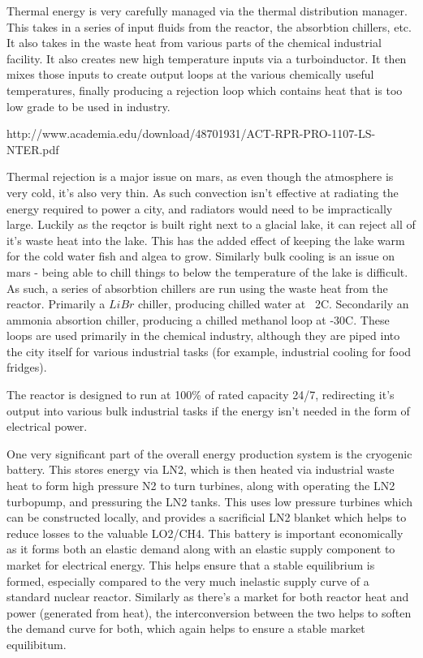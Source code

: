 \documentclass[10pt]{article}
\begin{document}
Thermal energy is very carefully managed via the thermal distribution manager. This takes in a series of input fluids from the reactor, the absorbtion chillers, etc. It also takes in the waste heat from various parts of the chemical industrial facility. It also creates new high temperature inputs via a turboinductor. It then mixes those inputs to create output loops at the various chemically useful temperatures, finally producing a rejection loop which contains heat that is too low grade to be used in industry.

http://www.academia.edu/download/48701931/ACT-RPR-PRO-1107-LS-NTER.pdf

Thermal rejection is a major issue on mars, as even though the atmosphere is very cold, it's also very thin. As such convection isn't effective at radiating the energy required to power a city, and radiators would need to be impractically large. Luckily as the reqctor is built right next to a glacial lake, it can reject all of it's waste heat into the lake. This has the added effect of keeping the lake warm for the cold water fish and algea to grow. Similarly bulk cooling is an issue on mars - being able to chill things to below the temperature of the lake is difficult. As such, a series of absorbtion chillers are run using the waste heat from the reactor. Primarily a $LiBr$ chiller, producing chilled water at ~2C. Secondarily an ammonia absortion chiller, producing a chilled methanol loop at -30C. These loops are used primarily in the chemical industry, although they are piped into the city itself for various industrial tasks (for example, industrial cooling for food fridges).

The reactor is designed to run at 100\% of rated capacity 24/7, redirecting it's output into various bulk industrial tasks if the energy isn't needed in the form of electrical power.

One very significant part of the overall energy production system is the cryogenic battery. This stores energy via LN2, which is then heated via industrial waste heat to form high pressure N2 to turn turbines, along with operating the LN2 turbopump, and pressuring the LN2 tanks. This uses low pressure turbines which can be constructed locally, and provides a sacrificial LN2 blanket which helps to reduce losses to the valuable LO2/CH4. This battery is important economically as it forms both an elastic demand along with an elastic supply component to market for electrical energy. This helps ensure that a stable equilibrium is formed, especially compared to the very much inelastic supply curve of a standard nuclear reactor. Similarly as there's a market for both reactor heat and power (generated from heat), the interconversion between the two helps to soften the demand curve for both, which again helps to ensure a stable market equilibitum.
\end{document}
